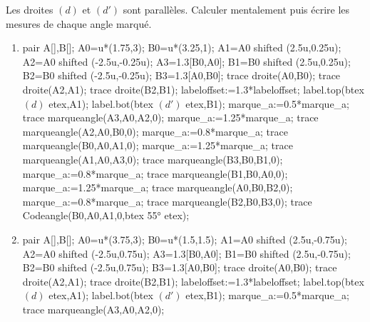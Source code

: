 \begin{exercice*}
   Les droites $(d)$ et $(d')$ sont parallèles. Calculer mentalement puis écrire les mesures de chaque angle marqué.
   \begin{enumerate}
      \item \phantom{rrr}\par\vspace*{-7mm}
         \begin{Geometrie}[CoinHD={(6u,4u)}]
            pair A[],B[];
            A0=u*(1.75,3);
            B0=u*(3.25,1);
            A1=A0 shifted (2.5u,0.25u);
            A2=A0 shifted (-2.5u,-0.25u);
            A3=1.3[B0,A0];
            B1=B0 shifted (2.5u,0.25u);
            B2=B0 shifted (-2.5u,-0.25u);
            B3=1.3[A0,B0];
            trace droite(A0,B0);
            trace droite(A2,A1);
            trace droite(B2,B1);
            labeloffset:=1.3*labeloffset;
            label.top(btex $(d)$ etex,A1);
            label.bot(btex $(d')$ etex,B1);         
            marque_a:=0.5*marque_a;
            trace marqueangle(A3,A0,A2,0);
            marque_a:=1.25*marque_a;
            trace marqueangle(A2,A0,B0,0);
            marque_a:=0.8*marque_a;
            trace marqueangle(B0,A0,A1,0);
            marque_a:=1.25*marque_a;
            trace marqueangle(A1,A0,A3,0);
            trace marqueangle(B3,B0,B1,0);
            marque_a:=0.8*marque_a;
            trace marqueangle(B1,B0,A0,0);
            marque_a:=1.25*marque_a;
            trace marqueangle(A0,B0,B2,0);
            marque_a:=0.8*marque_a;
            trace marqueangle(B2,B0,B3,0);
            trace Codeangle(B0,A0,A1,0,btex \ang{55} etex);
         \end{Geometrie}
      \item \phantom{rrr}\par\vspace*{-7mm}
         \begin{Geometrie}[CoinHD={(7u,4u)}]
            pair A[],B[];
            A0=u*(3.75,3);
            B0=u*(1.5,1.5);
            A1=A0 shifted (2.5u,-0.75u);
            A2=A0 shifted (-2.5u,0.75u);
            A3=1.3[B0,A0];
            B1=B0 shifted (2.5u,-0.75u);
            B2=B0 shifted (-2.5u,0.75u);
            B3=1.3[A0,B0];
            trace droite(A0,B0);
            trace droite(A2,A1);
            trace droite(B2,B1);
            labeloffset:=1.3*labeloffset;
            label.top(btex $(d)$ etex,A1);
            label.bot(btex $(d')$ etex,B1);         
            marque_a:=0.5*marque_a;
            trace marqueangle(A3,A0,A2,0);

\end{Geometrie}
\end{enumerate}
\end{exercice*}
